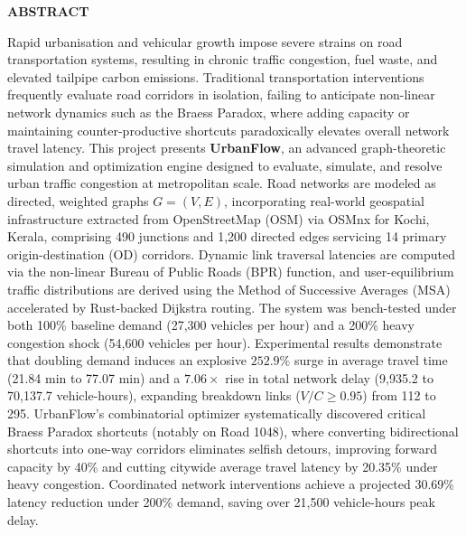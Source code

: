\documentclass[12pt,a4paper]{report}
\begin{document}
\begin{center}
    {\large\bfseries ABSTRACT\par}
\end{center}
\vspace{-0.1cm}
\noindent\footnotesize
Rapid urbanisation and vehicular growth impose severe strains on road transportation systems, resulting in chronic traffic congestion, fuel waste, and elevated tailpipe carbon emissions. Traditional transportation interventions frequently evaluate road corridors in isolation, failing to anticipate non-linear network dynamics such as the Braess Paradox, where adding capacity or maintaining counter-productive shortcuts paradoxically elevates overall network travel latency. This project presents \textbf{UrbanFlow}, an advanced graph-theoretic simulation and optimization engine designed to evaluate, simulate, and resolve urban traffic congestion at metropolitan scale. Road networks are modeled as directed, weighted graphs $G = (V, E)$, incorporating real-world geospatial infrastructure extracted from OpenStreetMap (OSM) via OSMnx for Kochi, Kerala, comprising 490 junctions and 1,200 directed edges servicing 14 primary origin-destination (OD) corridors. Dynamic link traversal latencies are computed via the non-linear Bureau of Public Roads (BPR) function, and user-equilibrium traffic distributions are derived using the Method of Successive Averages (MSA) accelerated by Rust-backed Dijkstra routing. The system was bench-tested under both 100\% baseline demand (27,300 vehicles per hour) and a 200\% heavy congestion shock (54,600 vehicles per hour). Experimental results demonstrate that doubling demand induces an explosive $252.9\%$ surge in average travel time (21.84 min to 77.07 min) and a $7.06\times$ rise in total network delay (9,935.2 to 70,137.7 vehicle-hours), expanding breakdown links ($V/C \ge 0.95$) from 112 to 295. UrbanFlow's combinatorial optimizer systematically discovered critical Braess Paradox shortcuts (notably on Road 1048), where converting bidirectional shortcuts into one-way corridors eliminates selfish detours, improving forward capacity by 40\% and cutting citywide average travel latency by 20.35\% under heavy congestion. Coordinated network interventions achieve a projected 30.69\% latency reduction under 200\% demand, saving over 21,500 vehicle-hours peak delay.
\end{document}
